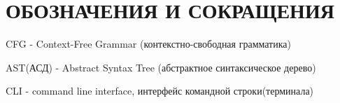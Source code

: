 
\chapter*{ОБОЗНАЧЕНИЯ И СОКРАЩЕНИЯ}             %


\ifdefined \acrstyle \else
    \newcommand{\acrstyle}[1]{#1}
\fi

\acrstyle{CFG} - Context-Free Grammar (контекстно-свободная грамматика)

\acrstyle{AST(АСД)} - Abstract Syntax Tree (абстрактное синтаксическое дерево)


\acrstyle{CLI} -  command line interface, интерфейс командной строки(терминала)

